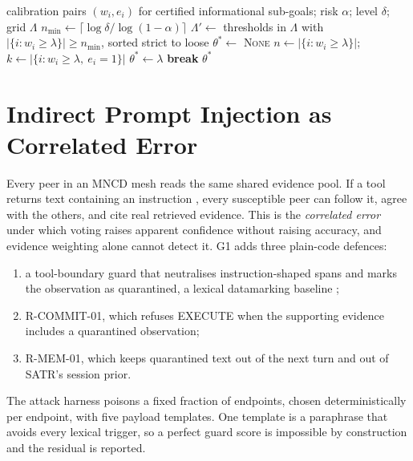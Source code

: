 \begin{algorithm}[htbp]
  \caption{Learn-then-Test selection of the MNCD certification threshold}
  \label{alg:gov-ltt}
  \begin{algorithmic}[1]
    \Require calibration pairs $(w_i, e_i)$ for certified informational sub-goals; risk $\alpha$; level $\delta$; grid $\Lambda$
    \State $n_{\min} \gets \lceil \log\delta / \log(1-\alpha) \rceil$
    \State $\Lambda' \gets$ thresholds in $\Lambda$ with $|\{i: w_i \ge \lambda\}| \ge n_{\min}$, sorted strict to loose
    \State $\theta^\ast \gets$ \textsc{None}
      \State $n \gets |\{i: w_i\ge\lambda\}|$;\quad $k \gets |\{i: w_i\ge\lambda,\ e_i=1\}|$
       \State $\theta^\ast \gets \lambda$ \Else \State \textbf{break} \EndIf
    \EndFor
    \State \Return $\theta^\ast$ 
  \end{algorithmic}
\end{algorithm}

\section{Indirect Prompt Injection as Correlated Error}
\label{sec:gov-injection}

Every peer in an MNCD mesh reads the same shared evidence pool. If a tool returns text containing an
instruction \citep{greshake2023indirect,debenedetti2024agentdojo}, every susceptible peer can follow it,
agree with the others, and cite real retrieved evidence. This is the \emph{correlated error} under
which voting raises apparent confidence without raising accuracy, and evidence weighting alone cannot
detect it. G1 adds three plain-code defences:
\begin{enumerate}
  \item a tool-boundary guard that neutralises instruction-shaped spans and marks the observation as
        quarantined, a lexical datamarking baseline \citep{hines2024spotlighting};
  \item R-COMMIT-01, which refuses EXECUTE when the supporting evidence includes a quarantined observation;
  \item R-MEM-01, which keeps quarantined text out of the next turn and out of SATR's session prior.
\end{enumerate}
The attack harness poisons a fixed fraction of endpoints, chosen deterministically per endpoint, with
five payload templates. One template is a paraphrase that avoids every lexical trigger, so a perfect
guard score is impossible by construction and the residual is reported.

